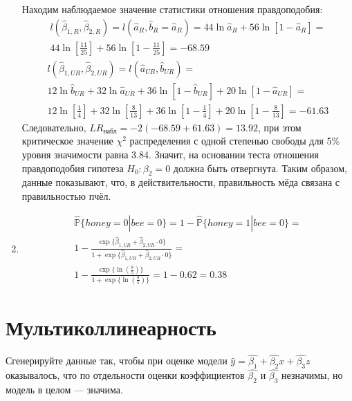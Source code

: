 \documentclass[pdftex,11pt,openany]{book}\usepackage[]{graphicx}\usepackage[]{color}
\begin{document}
\begin{solution}
\begin{enumerate}
Находим наблюдаемое значение статистики отношения правдоподобия:
\begin{multline}
l(\hat{\beta}_{1, R}, \hat{\beta}_{2, R}) = l(\hat{a}_R, \hat{b}_R = \hat{a}_R) = 44\ln\hat{a}_R + 56\ln[1-\hat{a}_R] =\\
 44\ln \left[ \frac{11}{25} \right] + 56\ln \left[ 1 - \frac{11}{25} \right] = -68.59
\end{multline}
\begin{multline}
l(\hat{\beta}_{1, UR}, \hat{\beta}_{2, UR}) = l(\hat{a}_{UR}, \hat{b}_{UR}) =\\
 12\ln \hat{b}_{UR} + 32 \ln \hat{a}_{UR} + 36\ln[1 - \hat{b}_{UR}] + 20\ln[1 - \hat{a}_{UR}] = \\
12\ln \left[ \frac{1}{4} \right] + 32\ln \left[ \frac{8}{13} \right] + 36\ln \left[ 1 - \frac{1}{4} \right] + 20\ln \left[1 - \frac{8}{13} \right] = -61.63
\end{multline}
Следовательно, $LR_{\text{набл}} = -2(-68.59 + 61.63) = 13.92$, при этом критическое значение $\chi^2$ распределения с одной степенью свободы для 5\% уровня значимости равна 3.84. Значит, на основании теста отношения правдоподобия гипотеза $H_0: \beta_2 = 0$ должна быть отвергнута. Таким образом, данные показывают, что, в действительности, правильность мёда связана с правильностью пчёл.

\item 
\begin{multline}
\hat{\mathbb{P}}\{honey = 0| bee = 0\} = 1 - \hat{\mathbb{P}}\{honey=1|bee=0\} = \\
1 - \frac{\exp\{\hat{\beta}_{1, UR} + \hat{\beta}_{2, UR} \cdot 0\}}{1 + \exp\{\hat{\beta}_{1, UR} + \hat{\beta}_{2, UR} \cdot 0\}} =\\
1 - \frac{\exp\{\ln\left( \frac{8}{5} \right)\}}{1 + \exp\{\ln\left( \frac{8}{5} \right)\}} = 1 - 0.62 = 0.38
\end{multline}
\end{enumerate}
\end{solution}










\chapter{Мультиколлинеарность}


\begin{problem}
Сгенерируйте данные так, чтобы при оценке модели $\hat{y}=\hat{\beta_1}+\hat{\beta_2}x+\hat{\beta_3}z$ оказывалось, что по отдельности оценки коэффициентов $\hat{\beta_2}$ и $\hat{\beta_3}$ незначимы, но модель в целом --- значима.
\end{problem}
\begin{solution}
\end{solution}
\end{document}
